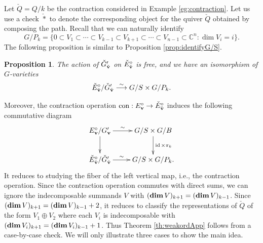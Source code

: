 \documentclass[12pt,reqno]{amsart}
\numberwithin{equation}{section}
\newtheorem{prop}[theorem]{Proposition}
\theoremstyle{definition}
\begin{document}
Let $\check{Q}= Q/k$ be the contraction considered in Example \ref{eg:contraction}. 
Let us use a check $\check{*}$ to denote the corresponding object for the quiver $\check{Q}$ obtained by composing the path. 
Recall that we can naturally identify
$$G/P_k=\{0\subset V_1\subset \cdots \subset 
V_{k-1}\subset V_{k+1}\subset \cdots \subset V_{n-1}\subset \mathbb{C}^n:\dim V_i=i\}.$$
The following proposition is similar to Proposition \ref{prop:identifyG/S}. 


\begin{prop}The action of $\check{G}_{\check{\mathbf{v}}}'$ on $\check{E}_{\check{\mathbf{v}}}^\circ$ is free, and we have an isomorphism of $G$-varieties
$$
\check{E}_{\check{\mathbf{v}}}^\circ/\check{G}_{\check{\mathbf{v}}}'\stackrel{\sim}\longrightarrow G/S\times G/P_k. $$
\end{prop}

Moreover, the contraction operation $\operatorname{con}:E_{\mathbf{v}}^\circ\to \check{E}_{\check{\mathbf{v}}}^\circ$ induces the following commutative diagram
$$
\xymatrix{
E_\vv^\circ/G_\vv'
\ar[r]^-{\sim}\ar[d]&
G/S\times G/B\ar[d]^{\operatorname{id}\times \pi_k}\\
\check{E}_{\check{\vv}}^\circ/\check{G}_{\check{\vv}}'\ar[r]^-{\sim} & G/S\times G/P_k.
}$$
It reduces to studying the fiber of the left vertical map, i.e., the contraction operation. 
Since the contraction operation commutes with direct sums, we can ignore the indecomposable summands $V$ with $(\operatorname{\mathbf{dim}} V)_{k+1}=(\operatorname{\mathbf{dim}} V)_{k-1}$. 
Since $(\operatorname{\mathbf{dim}} V)_{k+1}=(\operatorname{\mathbf{dim}} V)_{k-1}+2$, it reduces to classify the representations of $\check{Q}$ of the form 
$V_1\oplus V_2$ 
where each $V_i$ is indecomposable with $(\operatorname{\mathbf{dim}} V_i)_{k+1}=(\operatorname{\mathbf{dim}} V_i)_{k-1}+1$. 
Thus Theorem \ref{th:weakordApp} follows from a case-by-case check. 
We will only illustrate three cases to show the main idea.
\end{document}
